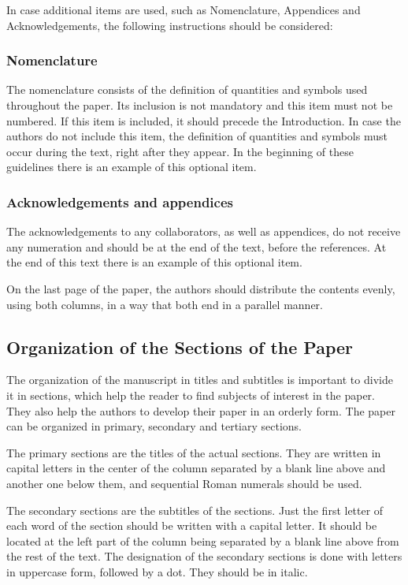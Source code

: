 \documentclass[english]{cobep-spec}
\begin{document}
In case additional items are used, such as Nomenclature, Appendices and Acknowledgements, the following instructions should be considered:

\subsubsection{Nomenclature}

The nomenclature consists of the definition of quantities and symbols used throughout the paper. Its inclusion is not mandatory and this item must not be numbered. If this item is included, it should precede the Introduction. In case the authors do not include this item, the  definition of quantities and symbols must occur during the text, right after they appear. In the beginning of these guidelines there is an example of this optional item.

\subsubsection{Acknowledgements and appendices}

The acknowledgements to any collaborators, as well as appendices, do not receive any numeration and should be at the end of the text, before the references. At the end of this text there is an example of this optional item.

On the last page of the paper, the authors should distribute the contents evenly, using both columns, in a way that both end in a parallel manner.

\subsection{Organization of the Sections of the Paper}

The organization of the manuscript in titles and subtitles is important to divide it in sections, which help the reader to find subjects of interest in the paper. They also help the authors to develop their paper in an orderly form. The paper can be organized in primary, secondary and tertiary sections.

The primary sections are the titles of the actual sections. They are written in capital letters in the center of the column separated by a blank line above and another one below them, and sequential Roman numerals should be used.

The secondary sections are the subtitles of the sections. Just the first letter of each word of the section should be written with a capital letter. It should be located at the left part of the column being separated by a blank line above from the rest of the text. The designation of the secondary sections is done with letters in uppercase form, followed by a dot. They should be in italic.
\end{document}
